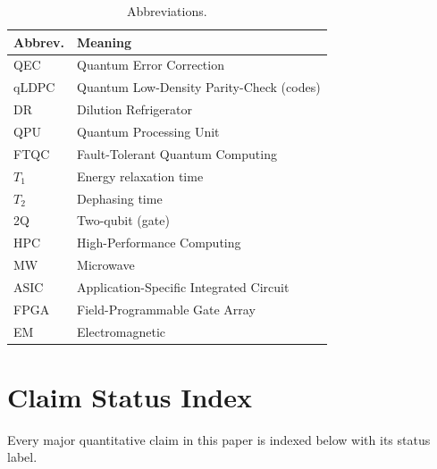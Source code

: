 \documentclass[conference]{IEEEtran}
\begin{document}
\begin{table}[htbp]
\centering
\caption{Abbreviations.}
\label{tab:abbrev}
\begin{tabular}{ll}
\toprule
\textbf{Abbrev.} & \textbf{Meaning} \\
\midrule
QEC & Quantum Error Correction \\
qLDPC & Quantum Low-Density Parity-Check (codes) \\
DR & Dilution Refrigerator \\
QPU & Quantum Processing Unit \\
FTQC & Fault-Tolerant Quantum Computing \\
$T_1$ & Energy relaxation time \\
$T_2$ & Dephasing time \\
2Q & Two-qubit (gate) \\
HPC & High-Performance Computing \\
MW & Microwave \\
ASIC & Application-Specific Integrated Circuit \\
FPGA & Field-Programmable Gate Array \\
EM & Electromagnetic \\
\bottomrule
\end{tabular}
\end{table}

\section{Claim Status Index}

Every major quantitative claim in this paper is indexed below with its status label.
\end{document}
